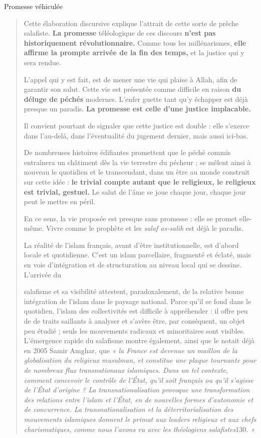 Promesse véhiculée

\begin{quote}
Cette élaboration discursive explique l'attrait de cette sorte de prêche
salafiste. \textbf{La promesse} téléologique de ces discours
\textbf{n'est pas historiquement révolutionnaire.} Comme tous les
millénarismes, \textbf{elle affirme la prompte arrivée de la fin des
temps,} et la justice qui y sera rendue.

L'appel qui y est fait, est de mener une vie qui plaise à Allah, afin de
garantir son salut. Cette vie est présentée comme difficile en raison
\textbf{du déluge de péchés} modernes. L'enfer guette tant qu'y échapper
est déjà presque un paradis. \textbf{La promesse est celle d'une justice
implacable.}

Il convient pourtant de signaler que cette justice est double : elle
s'exerce dans l'au-delà, dans l'éventualité du jugement dernier, mais
aussi ici-bas.

De nombreuses histoires édifiantes promettent que le péché commis
entraînera un châtiment dès la vie terrestre du pécheur ; se mêlent
ainsi à nouveau le quotidien et le transcendant, dans un être au monde
construit sur cette idée : \textbf{le trivial compte autant que le
religieux, le religieux est trivial, gestuel.} Le salut de l'âme se joue
chaque jour, chaque jour peut le mettre en péril.

En ce sens, la vie proposée est presque sans promesse : elle se promet
elle- même. Vivre comme le prophète et les \emph{salaf as-salih} est
déjà le paradis.

La réalité de l'islam français, avant d'être institutionnelle, est
d'abord locale et quotidienne. C'est un islam parcellaire, fragmenté et
éclaté, mais en voie d'intégration et de structuration au niveau local
qui se dessine. L'arrivée du



salafisme et sa visibilité attestent, paradoxalement, de la relative
bonne intégration de l'islam dans le paysage national. Parce qu'il se
fond dans le quotidien, l'islam des collectivités est difficile à
appréhender : il offre peu de de traits saillants à analyser et s'avère
être, par conséquent, un objet peu étudié ; seuls les mouvements
radicaux et minoritaires sont visibles. L'émergence rapide du salafisme
montre également, ainsi que le notait déjà en 2005 Samir Amghar, que
\emph{« la France est devenue un maillon de la globalisation du
religieux musulman, et constitue une plaque tournante pour de nombreux
flux transnationaux islamiques. Dans un tel contexte, comment concevoir
le contrôle de l'État, qu'il soit français ou qu'il s'agisse de l'État
d'origine ? La transnationalisation provoque une transformation des
relations entre l'islam et l'État, en de nouvelles formes d'autonomie et
de concurrence. La transnationalisation et la déterritorialisation des
mouvements islamiques donnent le primat aux leaders religieux et aux
chefs charismatiques, comme nous l'avons vu avec les théologiens
salafistes}130\emph{. »}


\end{quote}
